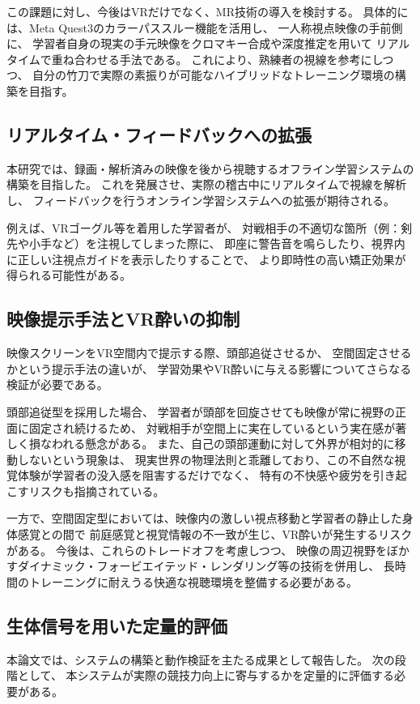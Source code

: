 \documentclass[dvipdfmx]{ujreport}
\begin{document}
    この課題に対し、今後はVRだけでなく、MR技術の導入を検討する。
    具体的には、Meta Quest3のカラーパススルー機能を活用し、
    一人称視点映像の手前側に、
    学習者自身の現実の手元映像をクロマキー合成や深度推定を用いて
    リアルタイムで重ね合わせる手法である。
    これにより、熟練者の視線を参考にしつつ、
    自分の竹刀で実際の素振りが可能なハイブリッドなトレーニング環境の構築を目指す。

    \subsection{リアルタイム・フィードバックへの拡張}
    本研究では、録画・解析済みの映像を後から視聴するオフライン学習システムの
    構築を目指した。
    これを発展させ、実際の稽古中にリアルタイムで視線を解析し、
    フィードバックを行うオンライン学習システムへの拡張が期待される。
    
    例えば、VRゴーグル等を着用した学習者が、
    対戦相手の不適切な箇所（例：剣先や小手など）を注視してしまった際に、
    即座に警告音を鳴らしたり、視界内に正しい注視点ガイドを表示したりすることで、
    より即時性の高い矯正効果が得られる可能性がある。

    \subsection{映像提示手法とVR酔いの抑制}
    映像スクリーンをVR空間内で提示する際、頭部追従させるか、
    空間固定させるかという提示手法の違いが、
    学習効果やVR酔いに与える影響についてさらなる検証が必要である。

    頭部追従型を採用した場合、
    学習者が頭部を回旋させても映像が常に視野の正面に固定され続けるため、
    対戦相手が空間上に実在しているという実在感が著しく損なわれる懸念がある。
    また、自己の頭部運動に対して外界が相対的に移動しないという現象は、
    現実世界の物理法則と乖離しており、この不自然な視覚体験が学習者の没入感を阻害するだけでなく、
    特有の不快感や疲労を引き起こすリスクも指摘されている。

    一方で、空間固定型においては、映像内の激しい視点移動と学習者の静止した身体感覚との間で
    前庭感覚と視覚情報の不一致が生じ、VR酔いが発生するリスクがある。
    今後は、これらのトレードオフを考慮しつつ、
    映像の周辺視野をぼかすダイナミック・フォービエイテッド・レンダリング等の技術を併用し、
    長時間のトレーニングに耐えうる快適な視聴環境を整備する必要がある。

    \subsection{生体信号を用いた定量的評価}
    本論文では、システムの構築と動作検証を主たる成果として報告した。
    次の段階として、
    本システムが実際の競技力向上に寄与するかを定量的に評価する必要がある。
\end{document}
